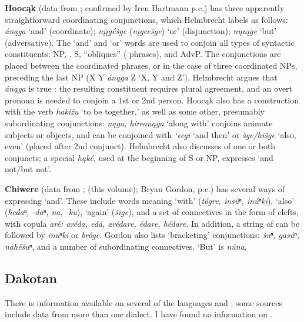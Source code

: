 \documentclass[output=paper]{LSP/langsci}
\begin{document}
\textbf{Hooc\k{a}k} (data from \citealt{Helmbrecht2004}; confirmed by Iren Hartmann p.c.) has three apparently straightforward coordinating conjunctions, which Helmbrecht labels as follows: \textit{án\k{a}ga} `and' (coordinate); \textit{n\k{i}\k{i}gé\v{s}ge} (\textit{n\k{i}gee\v{s}ge}) `or' (disjunction); \textit{n\k{u}n\k{i}ge} `but' (adversative). The `and' and `or' words are used to conjoin all types of syntactic constituents: NP, , S, ``obliques'' ( phrases), and AdvP. The conjunctions are placed between the coordinated phrases, or in the case of three coordinated NPs, preceding the last NP (X Y \textit{án\k{a}ga} Z `X, Y and Z'). Helmbrecht argues that \textit{án\k{a}ga}  is true : the resulting constituent requires plural agreement, and an overt pronoun is needed to conjoin a 1st or 2nd person. Hooc\k{a}k also has a  construction with the verb \textit{haki\v{z}u} `to be together,' as well as some other, presumably subordinating conjunctions: \textit{n\k{a}ga, hirean\k{a}ga} `along with' conjoins animate subjects or objects, and  can be conjoined with \textit{`eegi} `and then' or \textit{\v{s}ge/hi\v{s}ge} `also, even' (placed after 2nd conjunct). Helmbrecht also discusses  of one or both conjuncts; a special  \textit{h\k{a}ké}, used at the beginning of S or NP, expresses `and not/but not'.

\textbf{Chiwere} (data from \citealt{Goodtracks1992}; \citealt{Greer2016} (this volume); Bryan Gordon, p.c.) has several ways of expressing `and'. These include words meaning `with' (\textit{tógre, insúⁿ, inúⁿki}), `also' (\textit{hedaⁿ, -daⁿ, na, -ku}), `again' (\textit{\v{s}ige}), and a set of  connectives in the form of clefts, with copula \textit{aré: aréda, edá, arédare, édare, hédare}. In addition, a string of  can be followed by \textit{inuⁿki} or \textit{bróge}. Gordon also lists `bracketing' conjunctions: \textit{\v{s}uⁿ, gasúⁿ, nahé\v{s}uⁿ}, and a number of subordinating connectives. `But' is \textit{núna}.

\subsection{Dakotan}
 
There is information available on several of the  languages and ; some sources include data from more than one dialect. I have found no information on .
\end{document}
